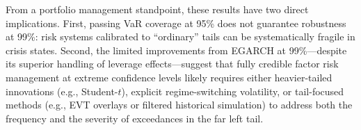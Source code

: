 \documentclass{article}
\begin{document}
From a portfolio management standpoint, these results have two direct implications. First, passing VaR coverage at 95\% does not guarantee robustness at 99\%: risk systems calibrated to ``ordinary'' tails can be systematically fragile in crisis states. Second, the limited improvements from EGARCH at 99\%—despite its superior handling of leverage effects—suggest that fully credible factor risk management at extreme confidence levels likely requires either heavier-tailed innovations (e.g., Student-$t$), explicit regime-switching volatility, or tail-focused methods (e.g., EVT overlays or filtered historical simulation) to address both the frequency and the severity of exceedances in the far left tail.\newline

\begin{landscape}
\begin{table}[!htbp]
\centering
\caption{Kupiec VaR Backtests for MSCI Equity Factors}
\label{tab:kupiec_var_panels}
\small
{}
\end{table}
\end{landscape}
\end{document}
